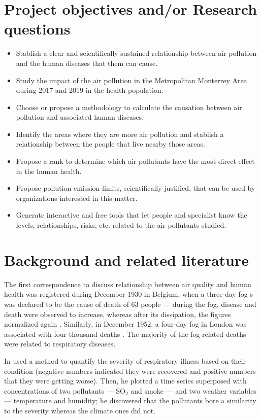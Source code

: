 \documentclass[
  11pt,
  a4paper,
  oneside
]{article}
\begin{document}
\section{Project objectives and/or Research questions}
\begin{itemize}
    \setlength\itemsep{-0.5em}
    \item Stablish a clear and scientifically sustained relationship between air pollution and the human diseases that them can cause.
    \item Study the impact of the air pollution in the Metropolitan Monterrey Area during  2017 and 2019 in the health population.
    \item Choose or propose a methodology to calculate the causation between air pollution and associated human diseases.
    \item Identify the areas where they are more air pollution and stablish a relationship between the people that live nearby those areas.
    \item Propose a rank to determine which air pollutants have the most direct effect in the human health.
    \item Propose pollution emission limits, scientifically justified, that can be used by organizations interested in this matter.
    \item Generate interactive and free tools that let people and specialist know the levels, relationships, risks, etc. related to the air pollutants studied.
\end{itemize}

\section{Background and related literature}
The first correspondence to discuss relationship between air quality and human health was registered during December 1930 in Belgium, when a three-day fog s was declared to be the cause of death of 63 people --- during the fog, disease and death were observed to increase, whereas after its dissipation, the  figures normalized again \citep{firket1936}. Similarly, in December 1952, a four-day fog in London was associated with four thousand deaths \citep{logan1953}. The majority of the fog-related deaths were related to respiratory diseases.

In \citeyear{Lawther1959} \citeauthor{Lawther1959} used a method to quantify the severity of respiratory illness based on their condition (negative numbers indicated they were recovered and positive numbers that they were getting worse). Then, he plotted a time series superposed with concentrations of two pollutants --- SO$_2$ and smoke --- and two weather variables --- temperature and humidity; he discovered that the pollutants bore a similarity to the severity whereas the climate ones did not.
\end{document}
